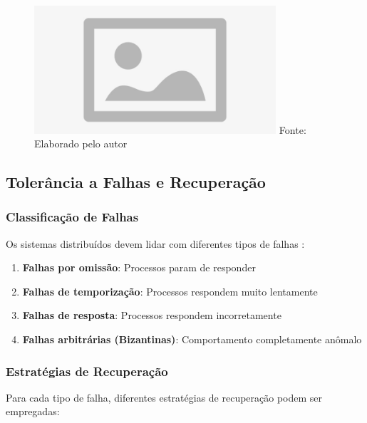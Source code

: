 \begin{figure}[H]
\centering
{}
\includegraphics[width=0.8\textwidth]{figure/placeholder.jpg}
\label{fig:escalabilidade_comparacao}
{\fontsize{10pt}{\baselineskip}\selectfont
Fonte: Elaborado pelo autor}
\end{figure}

\subsection{Tolerância a Falhas e Recuperação}

\subsubsection{Classificação de Falhas}

Os sistemas distribuídos devem lidar com diferentes tipos de falhas \cite{coulouris2013sistemas}:

\begin{enumerate}
    \item \textbf{Falhas por omissão}: Processos param de responder
    \item \textbf{Falhas de temporização}: Processos respondem muito lentamente
    \item \textbf{Falhas de resposta}: Processos respondem incorretamente
    \item \textbf{Falhas arbitrárias (Bizantinas)}: Comportamento completamente anômalo
\end{enumerate}

\subsubsection{Estratégias de Recuperação}

Para cada tipo de falha, diferentes estratégias de recuperação podem ser empregadas:

